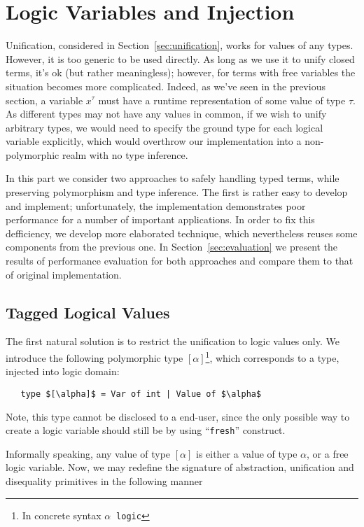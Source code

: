 \section{Logic Variables and Injection}
\label{sec:injection}

Unification, considered in Section~\ref{sec:unification}, works for values of any types. However, it
is too generic to be used directly. As long as we use it to unify closed terms, it's ok (but rather meaningless); 
however, for terms with free variables the situation becomes more complicated. Indeed, as we've seen in the
previous section, a variable $x^\tau$ must have a runtime representation of some value of type $\tau$. As different
types may not have any values in common, if we wish to unify arbitrary types, we would need to specify the 
ground type for each logical variable explicitly, which would overthrow our implementation into a non-polymorphic 
realm with no type inference.

In this part we consider two approaches to safely handling typed terms, while preserving polymorphism and
type inference. The first is rather easy to develop and implement; unfortunately, the implementation demonstrates 
poor performance for a number of important applications. In order to fix this defficiency, we develop more 
elaborated technique, which nevertheless reuses some components from the previous one. In Section~\ref{sec:evaluation}
we present the results of performance evaluation for both approaches and compare them to that of original 
implementation.

\subsection{Tagged Logical Values}

The first natural solution is to restrict the unification to logic values only. We introduce the following polymorphic
type $[\alpha]$\footnote{In concrete syntax $\alpha\;\;$\lstinline{logic}}, which corresponds to a type, injected into
logic domain:

\begin{lstlisting}
   type $[\alpha]$ = Var of int | Value of $\alpha$
\end{lstlisting}

Note, this type cannot be disclosed to a end-user, since the only possible way to create a logic variable should 
still be by using ``\lstinline{fresh}'' construct.

Informally speaking, any value of type $[\alpha]$ is either a value of type $\alpha$, or a free
logic variable. Now, we may redefine the signature of abstraction, unification and disequality primitives in the
following manner

